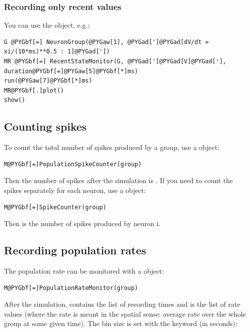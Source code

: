 \documentclass[letterpaper,10pt,english]{manual}
\begin{document}
\subsubsection{Recording only recent values}

You can use the \hyperlink{brian.RecentStateMonitor}{} object, e.g.:

\begin{Verbatim}[commandchars=@\[\]]
G @PYGbf[=] NeuronGroup(@PYGaw[1], @PYGad[']@PYGad[dV/dt = xi/(10*ms)**0.5 : 1]@PYGad['])
MR @PYGbf[=] RecentStateMonitor(G, @PYGad[']@PYGad[V]@PYGad['], duration@PYGbf[=]@PYGaw[5]@PYGbf[*]ms)
run(@PYGaw[7]@PYGbf[*]ms)
MR@PYGbf[.]plot()
show()
\end{Verbatim}


\subsection{Counting spikes}

To count the total number of spikes produced by a group, use a \hyperlink{brian.PopulationSpikeCounter}{} object:

\begin{Verbatim}[commandchars=@\[\]]
M@PYGbf[=]PopulationSpikeCounter(group)
\end{Verbatim}

Then the number of spikes after the simulation is . If you need to count the spikes
separately for each neuron, use a \hyperlink{brian.SpikeCounter}{} object:

\begin{Verbatim}[commandchars=@\[\]]
M@PYGbf[=]SpikeCounter(group)
\end{Verbatim}

Then  is the number of spikes produced by neuron i.


\subsection{Recording population rates}

The population rate can be monitored with a \hyperlink{brian.PopulationRateMonitor}{} object:

\begin{Verbatim}[commandchars=@\[\]]
M@PYGbf[=]PopulationRateMonitor(group)
\end{Verbatim}

After the simulation,  contains the list of recording times and
 is the list of rate values (where the rate is meant in the spatial sense: average rate over
the whole group at some given time). The bin size is set with the  keyword (in seconds):
\end{document}
